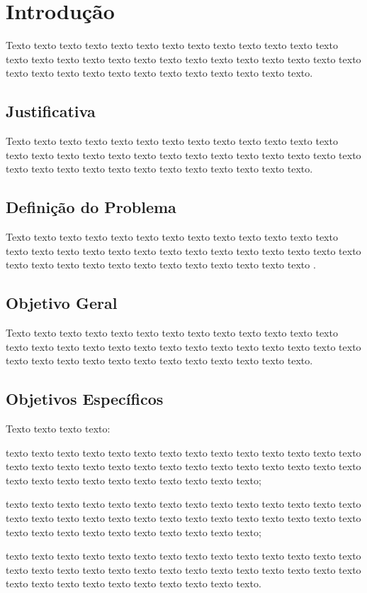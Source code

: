 \chapter{Introdução}


Texto texto texto texto texto texto texto texto texto texto texto texto texto texto texto texto texto texto texto texto texto texto texto texto texto texto texto texto texto texto texto texto texto texto texto texto texto texto texto. 


\section{Justificativa}

Texto texto texto texto texto texto texto texto texto texto texto texto texto texto texto texto texto texto texto texto texto texto texto texto texto texto texto texto texto texto texto texto texto texto texto texto texto texto texto.

\section{Definição do Problema}

Texto texto texto texto texto texto texto texto texto texto texto texto texto texto texto texto texto texto texto texto texto texto texto texto texto texto texto texto texto texto texto texto texto texto texto texto texto texto texto \cite{ref:vazquez}.

\section{Objetivo Geral}

Texto texto texto texto texto texto texto texto texto texto texto texto texto texto texto texto texto texto texto texto texto texto texto texto texto texto texto texto texto texto texto texto texto texto texto texto texto texto texto.

\section{Objetivos Específicos}

Texto texto texto texto:
\begin{alineas}
    \item texto texto texto texto texto texto texto texto texto texto texto texto texto texto texto texto texto texto texto texto texto texto texto texto texto texto texto texto texto texto texto texto texto texto texto texto texto texto;
    \item texto texto texto texto texto texto texto texto texto texto texto texto texto texto texto texto texto texto texto texto texto texto texto texto texto texto texto texto texto texto texto texto texto texto texto texto texto texto; 
    \item texto texto texto texto texto texto texto texto texto texto texto texto texto texto texto texto texto texto texto texto texto texto texto texto texto texto texto texto texto texto texto texto texto texto texto texto texto texto.
\end{alineas}
